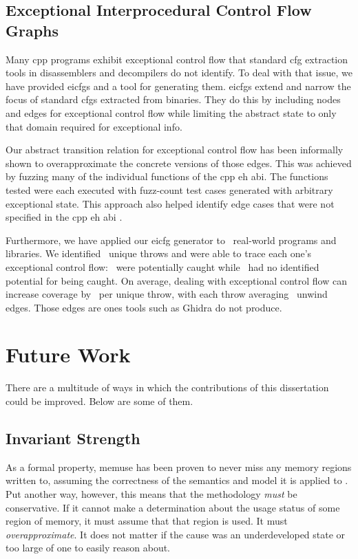\subsection{Exceptional Interprocedural Control Flow Graphs}
Many \gls{cpp} programs exhibit exceptional control flow that standard \ac{cfg} extraction tools in disassemblers and decompilers do not identify.
To deal with that issue, we have provided \acp{eicfg} and a tool for generating them.
\acp{eicfg} extend and narrow the focus of standard \acp{cfg} extracted from binaries.
They do this by including nodes and edges for exceptional control flow while limiting the abstract state to only that domain required for exceptional info.

Our abstract transition relation for exceptional control flow has been informally shown to overapproximate the concrete versions of those edges.
This was achieved by fuzzing many of the individual functions of the \gls{cpp} \ac{eh} \ac{abi}.
The functions tested were each executed with \gls{fuzz-count} test cases generated with arbitrary exceptional state.
This approach also helped identify edge cases that were not specified in the \gls{cpp} \ac{eh} \ac{abi} \cite{cxxEhAbi}.

Furthermore, we have applied our \ac{eicfg} generator to \totalbins\ real-world programs and libraries.
We identified \uniquethrows\ unique throws and were able to trace each one's exceptional control flow: \caughtthrows\ were potentially caught while \uncaughtthrows\ had no identified potential for being caught.
On average, dealing with exceptional control flow can increase coverage by \avgdiffinst\ per unique throw, with each throw averaging \avgunwinds\ unwind edges.
Those edges are ones tools such as Ghidra do not produce.

\section{Future Work}
There are a multitude of ways in which the contributions of this dissertation could be improved.
Below are some of them.

\subsection{Invariant Strength}
As a formal property, \gls{memuse} has been proven to never miss any memory regions written to, assuming the correctness of the semantics and model it is applied to \autocite{bockenek2019preservation,verbeek2022lifting}.
Put another way, however, this means that the methodology \emph{must} be conservative.
If it cannot make a determination about the usage status of some region of memory,
it must assume that that region is used. It must \emph{overapproximate}.%
It does not matter if the cause was an underdeveloped state or too large of one to easily reason about.

